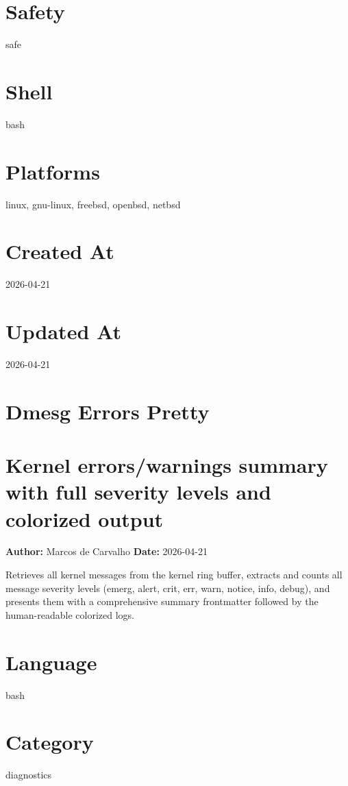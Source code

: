 \documentclass[openany]{book}
\begin{document}
\section*{Safety}
safe

\section*{Shell}
bash

\section*{Platforms}
linux, gnu-linux, freebsd, openbsd, netbsd

\section*{Created At}
2026-04-21

\section*{Updated At}
2026-04-21

\section{Dmesg Errors Pretty}
\section*{Kernel errors/warnings summary with full severity levels and colorized output}
\textbf{Author:} Marcos de Carvalho \hfill \textbf{Date:} 2026-04-21

\noindent Retrieves all kernel messages from the kernel ring buffer, extracts and counts all message severity levels (emerg, alert, crit, err, warn, notice, info, debug), and presents them with a comprehensive summary frontmatter followed by the human-readable colorized logs.

\section*{Language}
bash

\section*{Category}
diagnostics
\end{document}
